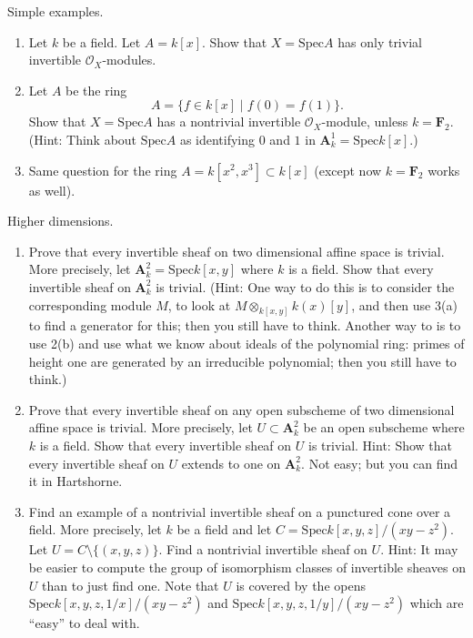 \begin{exercise}
Simple examples.
\begin{enumerate}
\item Let $k$ be a field. Let $A = k[x]$.
Show that $X=\text{Spec} A$ has only trivial invertible ${\mathcal O}_X$-modules.
\item Let $A$ be the ring
$$
A = \{ f\in k[x] \mid f(0)=f(1) \}.
$$
Show that $X = \text{Spec} A$ has a nontrivial invertible ${\mathcal O}_X$-module,
unless $k={\mathbf F}_2$. (Hint: Think about $\text{Spec} A$ as identifying
$0$ and $1$ in ${\mathbf A}^1_k=\text{Spec} k[x]$.)
\item Same question for the ring $A = k[x^2,x^3] \subset
k[x]$ (except now $k = {\mathbf F}_2$ works as well).
\end{enumerate}
\end{exercise}

\begin{exercise}
Higher dimensions.
\begin{enumerate}
\item Prove that every invertible sheaf on two dimensional
affine space is trivial. More precisely, let 
${\mathbf A}^2_k = \text{Spec} k[x,y]$ where $k$ is a field.
Show that every invertible sheaf on ${\mathbf A}^2_k$ is trivial.
(Hint: One way to do this is to consider the corresponding
module $M$, to look at $M \otimes_{k[x,y]} k(x)[y]$, and
then use 3(a) to find a generator for this; then you still have to think.
Another way to is to use 2(b) and use what we know about ideals of the
polynomial ring: primes of height one are generated by an irreducible
polynomial; then you still have to think.)
\item Prove that every invertible sheaf on any open
subscheme of two dimensional affine space is trivial. More precisely, let 
$U \subset {\mathbf A}^2_k$ be an open subscheme where $k$ is a field.
Show that every invertible sheaf on $U$ is trivial. Hint: Show that every
invertible sheaf on $U$ extends to one on ${\mathbf A}^2_k$. Not easy;
but you can find it in Hartshorne.
\item Find an example of a nontrivial
invertible sheaf on a punctured cone over a field. More
precisely, let $k$ be a field and let $C = \text{Spec} k[x,y,z]/(xy-z^2)$.
Let $U = C \setminus \{ (x,y,z) \}$. Find a nontrivial
invertible sheaf on $U$. Hint: It may be easier to compute the
group of isomorphism classes of invertible sheaves on $U$ than to
just find one. Note that $U$ is covered by the opens 
$\text{Spec} k[x,y,z,1/x]/(xy-z^2) $ and $\text{Spec} k[x,y,z,1/y]/(xy-z^2)$
which are ``easy'' to deal with.
\end{enumerate}
\end{exercise}

